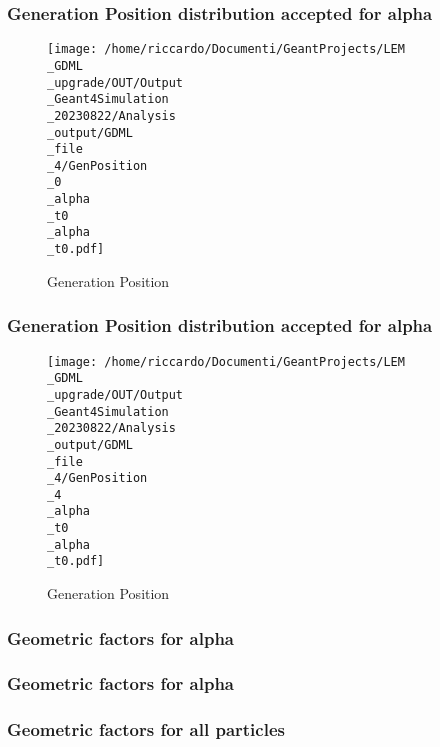 \documentclass[8pt]{beamer}
\begin{document}
            \begin{frame}
                \frametitle{Generation Position distribution accepted for alpha}
            
        \begin{figure}[h]
            \centering
            \texttt{[image: /home/riccardo/Documenti/GeantProjects/LEM\\\_GDML\\\_upgrade/OUT/Output\\\_Geant4Simulation\\\_20230822/Analysis\\\_output/GDML\\\_file\\\_4/GenPosition\\\_0\\\_alpha\\\_t0\\\_alpha\\\_t0.pdf]}
            \caption{Generation Position}
        \end{figure}
        
            \end{frame}
            
            \begin{frame}
                \frametitle{Generation Position distribution accepted for alpha}
            
        \begin{figure}[h]
            \centering
            \texttt{[image: /home/riccardo/Documenti/GeantProjects/LEM\\\_GDML\\\_upgrade/OUT/Output\\\_Geant4Simulation\\\_20230822/Analysis\\\_output/GDML\\\_file\\\_4/GenPosition\\\_4\\\_alpha\\\_t0\\\_alpha\\\_t0.pdf]}
            \caption{Generation Position}
        \end{figure}
        
            \end{frame}
            
            \begin{frame}
                \frametitle{Geometric factors for alpha}
            
            \end{frame}
            
            \begin{frame}
                \frametitle{Geometric factors for alpha}
            
            \end{frame}
            
            \begin{frame}
                \frametitle{Geometric factors for all particles}
            
            \end{frame}
            
        
\end{document}
